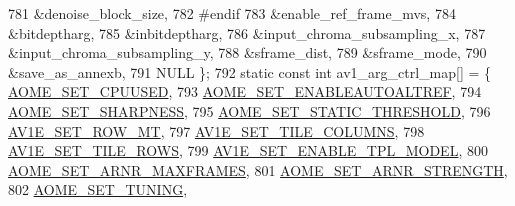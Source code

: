 \begin{DoxyCodeInclude}
{{{{{{{781                                        &denoise\_block\_size,
782 \textcolor{preprocessor}{#endif}
783                                        &enable\_ref\_frame\_mvs,
784                                        &bitdeptharg,
785                                        &inbitdeptharg,
786                                        &input\_chroma\_subsampling\_x,
787                                        &input\_chroma\_subsampling\_y,
788                                        &sframe\_dist,
789                                        &sframe\_mode,
790                                        &save\_as\_annexb,
791                                        NULL \};
792 \textcolor{keyword}{static} \textcolor{keyword}{const} \textcolor{keywordtype}{int} av1\_arg\_ctrl\_map[] = \{ \hyperlink{group__aom__encoder_ggae78dde67a6d78f332e9bdba0dde42db5adac09e1a8da079b08fca5ccbf981f1a6}{AOME\_SET\_CPUUSED},
793                                         \hyperlink{group__aom__encoder_ggae78dde67a6d78f332e9bdba0dde42db5ac8a24393f214823f5a6bd345afb840b6}{AOME\_SET\_ENABLEAUTOALTREF},
794                                         \hyperlink{group__aom__encoder_ggae78dde67a6d78f332e9bdba0dde42db5a0df0d30e82bb9683f3131138dfa2949a}{AOME\_SET\_SHARPNESS},
795                                         \hyperlink{group__aom__encoder_ggae78dde67a6d78f332e9bdba0dde42db5aa4f58f6a86b710e403daeac055738111}{AOME\_SET\_STATIC\_THRESHOLD},
796                                         \hyperlink{group__aom__encoder_ggae78dde67a6d78f332e9bdba0dde42db5a095d0817d339940aa2578924a840fc84}{AV1E\_SET\_ROW\_MT},
797                                         \hyperlink{group__aom__encoder_ggae78dde67a6d78f332e9bdba0dde42db5acf4ab1ff2fa8d76a78881ad7f1a1294d}{AV1E\_SET\_TILE\_COLUMNS},
798                                         \hyperlink{group__aom__encoder_ggae78dde67a6d78f332e9bdba0dde42db5a57f2f2a54f593b398a5e97db7982f817}{AV1E\_SET\_TILE\_ROWS},
799                                         \hyperlink{group__aom__encoder_ggae78dde67a6d78f332e9bdba0dde42db5a174ffbc2e91a020a8225900e38894137}{AV1E\_SET\_ENABLE\_TPL\_MODEL},
800                                         \hyperlink{group__aom__encoder_ggae78dde67a6d78f332e9bdba0dde42db5a327fb270f37bbb008b0f146542ce7483}{AOME\_SET\_ARNR\_MAXFRAMES},
801                                         \hyperlink{group__aom__encoder_ggae78dde67a6d78f332e9bdba0dde42db5affd2c213f24a12d13bb51e31be993e60}{AOME\_SET\_ARNR\_STRENGTH},
802                                         \hyperlink{group__aom__encoder_ggae78dde67a6d78f332e9bdba0dde42db5aba539b6646278e7ff40f67f38639d294}{AOME\_SET\_TUNING},
}}}}}}}
\end{DoxyCodeInclude}

